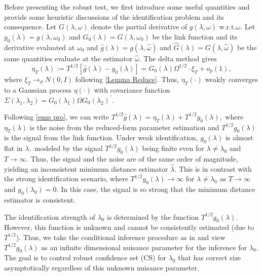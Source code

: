 \documentclass[11pt, letterpaper, twoside]{article}
\begin{document}
Before presenting the robust test, we first introduce some useful quantities and provide some heuristic discussions of the identification problem and its consequence. Let $G(\lambda ,\omega )$ denote the partial derivative of $ g(\lambda ,\omega )$ w.r.t.\@ $\omega .$ Let $g_{0}(\lambda )=g(\lambda ,\omega _{0})$ and $G_{0}(\lambda )=G(\lambda ,\omega _{0})$ be the link function and its derivative evaluated at $\omega _{0}$ and $\widehat{g}(\lambda
)=g(\lambda ,\widehat{\omega })$ and $\widehat{G}(\lambda )=G(\lambda , \widehat{\omega })$ be the same quantities evaluate at the estimator $ \widehat{\omega }.$ The delta method gives 
%
\begin{equation}
    \eta _{T}(\lambda ):=T^{1/2}\left[ \widehat{g}(\lambda )-g_{0}(\lambda ) \right] =G_{0}(\lambda )\Omega ^{1/2}\cdot \xi _{T}+o_{p}(1),
    \label{emp pro}
\end{equation}
%
where $\xi _{T}\rightarrow _{d}N(0,I)$ following \cref{Lemma Reduce}.  Thus, $\eta _{T}(\cdot )$ weakly converges to a Gaussian process $\eta (\cdot )$ with covariance function $\Sigma (\lambda _{1},\lambda _{2})=G_{0}(\lambda _{1})\Omega G_{0}(\lambda _{2})^{\prime }.$

Following \cref{emp pro}, we can write $T^{1/2}\widehat{g}(\lambda )=\eta _{T}(\lambda )+T^{1/2}g_{0}(\lambda ),$ where $\eta _{T}(\lambda )$ is the noise from the reduced-form parameter estimation and $T^{1/2}g_{0}(\lambda )$ is the signal from the link function. Under weak identification, $ g_{0}(\lambda )$ is almost flat in $\lambda ,$ modeled by the signal $ T^{1/2}g_{0}(\lambda )$ being finite even for $\lambda \neq \lambda _{0}$ and $T\rightarrow \infty .$ Thus, the signal and the noise are of the same order of magnitude, yielding an inconsistent minimum distance estimator $ \widehat{\lambda }.$ This is in contrast with the strong identification scenario, where $T^{1/2}g_{0}(\lambda )\rightarrow \infty $ for $\lambda \neq \lambda _{0}$ as $T\rightarrow \infty $ and $g_{0}(\lambda _{0})=0.$ In this case, the signal is so strong that the minimum distance estimator is consistent.

The identification strength of $\lambda _{0}$ is determined by the function $ T^{1/2}g_{0}(\lambda ).$ However, this function is unknown and cannot be consistently estimated (due to $T^{1/2}$). Thus, we take the conditional inference procedure as in \textcite{andrews2016conditional} and view $ T^{1/2}g_{0}(\lambda )$ as an infinite dimensional nuisance parameter for the inference for $\lambda _{0}$. The goal is to control robust confidence set (CS) for $\lambda _{0}$ that has correct size asymptotically regardless of this unknown nuisance parameter.
\end{document}
